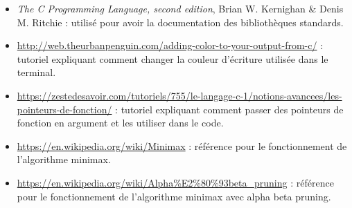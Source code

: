 \documentclass[12pt,S,fira-sans]{paper}
\begin{document}
\begin{itemize}
    \item \emph{The C Programming Language, second edition}, Brian W. Kernighan \& Denis M. Ritchie : utilisé pour avoir la documentation des bibliothèques standards.
    \item \url{http://web.theurbanpenguin.com/adding-color-to-your-output-from-c/} : tutoriel expliquant comment changer la couleur d'écriture utilisée dans le terminal.
    \item \url{https://zestedesavoir.com/tutoriels/755/le-langage-c-1/notions-avancees/les-pointeurs-de-fonction/} : tutoriel expliquant comment passer des pointeurs de fonction en argument et les utiliser dans le code.
    \item \url{https://en.wikipedia.org/wiki/Minimax} : référence pour le fonctionnement de l'algorithme minimax.
    \item \url{https://en.wikipedia.org/wiki/Alpha%E2%80%93beta_pruning} : référence pour le fonctionnement de l'algorithme minimax avec alpha beta pruning.
\end{itemize}
\end{document}
